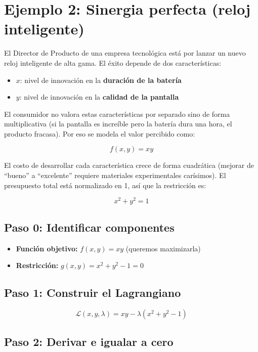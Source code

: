 \documentclass[12pt]{article}
\begin{document}
\section{Ejemplo 2: Sinergia perfecta (reloj inteligente)}

El Director de Producto de una empresa tecnológica está por lanzar un nuevo reloj inteligente de alta gama. El éxito depende de dos características:

\begin{itemize}
    \item $x$: nivel de innovación en la \textbf{duración de la batería}
    \item $y$: nivel de innovación en la \textbf{calidad de la pantalla}
\end{itemize}

El consumidor no valora estas características por separado sino de forma multiplicativa (si la pantalla es increíble pero la batería dura una hora, el producto fracasa). Por eso se modela el valor percibido como:

\[
f(x, y) = xy
\]

El costo de desarrollar cada característica crece de forma cuadrática (mejorar de ``bueno'' a ``excelente'' requiere materiales experimentales carísimos). El presupuesto total está normalizado en 1, así que la restricción es:

\[
x^2 + y^2 = 1
\]

\subsection{Paso 0: Identificar componentes}

\begin{itemize}
    \item \textbf{Función objetivo:} $f(x, y) = xy$ (queremos maximizarla)
    \item \textbf{Restricción:} $g(x, y) = x^2 + y^2 - 1 = 0$
\end{itemize}

\subsection{Paso 1: Construir el Lagrangiano}

\[
\mathcal{L}(x, y, \lambda) = xy - \lambda(x^2 + y^2 - 1)
\]

\subsection{Paso 2: Derivar e igualar a cero}
\end{document}
